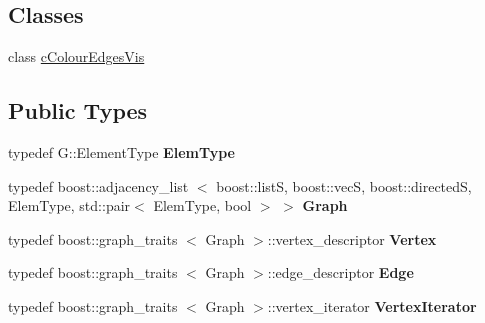 \subsection*{\-Classes}
\begin{DoxyCompactItemize}
\item 
class \hyperlink{classcCayleyGrf_1_1cColourEdgesVis}{c\-Colour\-Edges\-Vis}
\end{DoxyCompactItemize}
\subsection*{\-Public \-Types}
\begin{DoxyCompactItemize}
\item 
\hypertarget{classcCayleyGrf_a96e2347884f970817ad4f941ff85f478}{typedef \-G\-::\-Element\-Type {\bfseries \-Elem\-Type}}\label{classcCayleyGrf_a96e2347884f970817ad4f941ff85f478}

\item 
\hypertarget{classcCayleyGrf_aa6ec3ba98e73a5c244786d88e05dc380}{typedef boost\-::adjacency\-\_\-list\*
$<$ boost\-::list\-S, boost\-::vec\-S, \*
boost\-::directed\-S, \-Elem\-Type, \*
std\-::pair$<$ \-Elem\-Type, bool $>$ $>$ {\bfseries \-Graph}}\label{classcCayleyGrf_aa6ec3ba98e73a5c244786d88e05dc380}

\item 
\hypertarget{classcCayleyGrf_a1ef27f6e825137691b820322094745b3}{typedef boost\-::graph\-\_\-traits\*
$<$ \-Graph $>$\-::vertex\-\_\-descriptor {\bfseries \-Vertex}}\label{classcCayleyGrf_a1ef27f6e825137691b820322094745b3}

\item 
\hypertarget{classcCayleyGrf_abade7422415758e7d2699ccfa052accb}{typedef boost\-::graph\-\_\-traits\*
$<$ \-Graph $>$\-::edge\-\_\-descriptor {\bfseries \-Edge}}\label{classcCayleyGrf_abade7422415758e7d2699ccfa052accb}

\item 
\hypertarget{classcCayleyGrf_a8a2a9d7e45de509f97daf663b6827496}{typedef boost\-::graph\-\_\-traits\*
$<$ \-Graph $>$\-::vertex\-\_\-iterator {\bfseries \-Vertex\-Iterator}}\label{classcCayleyGrf_a8a2a9d7e45de509f97daf663b6827496}

\end{DoxyCompactItemize}
